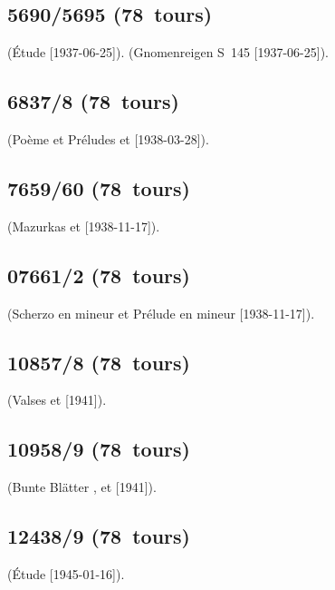 \subsection{5690/5695 (78~tours)}

\Scriabine{} (Étude   [1937-06-25]).
\Liszt{} (Gnomenreigen S~145  [1937-06-25]).

\subsection{6837/8 (78~tours)}

\Scriabine{} (Poème   et Préludes   et
  [1938-03-28]).

\subsection{7659/60 (78~tours)}

\Chopin{} (Mazurkas   et  
[1938-11-17]).

\subsection{07661/2 (78~tours)}

\Goltz{} (Scherzo en \kE mineur et Prélude en \kE mineur [1938-11-17]).

\subsection{10857/8 (78~tours)}

\Chopin{} (Valses   et   [1941]).

\subsection{10958/9 (78~tours)}

\Schumann{} (Bunte Blätter  ,   et
  [1941]).

\subsection{12438/9 (78~tours)}

\Scriabine{} (Étude   [1945-01-16]).

